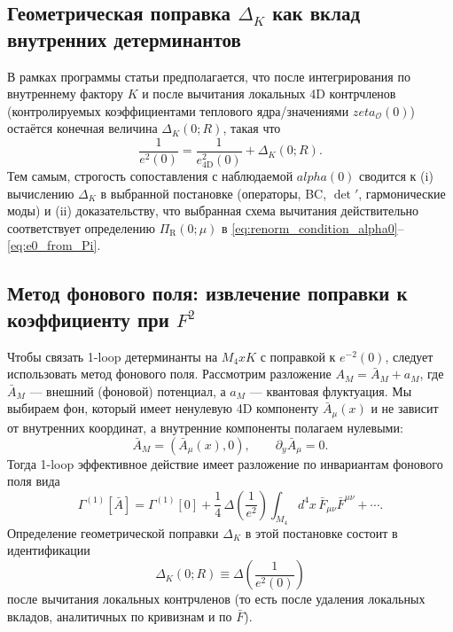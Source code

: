 \documentclass[12pt]{article}
\def\alpha{alpha}%
\def\times{x}%
\def\zeta{zeta}%
\begin{document}
\subsection{Геометрическая поправка \texorpdfstring{$\Delta_K$}{DeltaK} как вклад внутренних детерминантов}
В рамках программы статьи предполагается, что после интегрирования по внутреннему фактору $K$ и после вычитания локальных 4D контрчленов (контролируемых коэффициентами теплового ядра/значениями $\zeta_{\mathcal{O}}(0)$) остаётся конечная величина $\Delta_K(0;R)$, такая что
\begin{equation}
\frac{1}{e^2(0)}
=
\frac{1}{e^2_{\mathrm{4D}}(0)}
+
\Delta_K(0;R).
\end{equation}
Тем самым, строгость сопоставления с наблюдаемой \texorpdfstring{$\alpha(0)$}{alpha(0)} сводится к (i) вычислению $\Delta_K$ в выбранной постановке (операторы, BC, $\det'$, гармонические моды) и (ii) доказательству, что выбранная схема вычитания действительно соответствует определению $\Pi_{\mathrm{R}}(0;\mu)$ в \eqref{eq:renorm_condition_alpha0}--\eqref{eq:e0_from_Pi}.

\subsection{Метод фонового поля: извлечение поправки к коэффициенту при \texorpdfstring{$F^2$}{F2}}
Чтобы связать 1-loop детерминанты на $M_4\times K$ с поправкой к $e^{-2}(0)$, следует использовать метод фонового поля.
Рассмотрим разложение $A_M=\bar A_M+a_M$, где $\bar A_M$ --- внешний (фоновой) потенциал, а $a_M$ --- квантовая флуктуация.
Мы выбираем фон, который имеет ненулевую 4D компоненту $\bar A_\mu(x)$ и не зависит от внутренних координат, а внутренние компоненты полагаем нулевыми:
\begin{equation}
  \bar A_M=(\bar A_\mu(x),0),
  \qquad
  \partial_y \bar A_\mu=0.
\end{equation}
Тогда 1-loop эффективное действие имеет разложение по инвариантам фонового поля вида
\begin{equation}
  \Gamma^{(1)}[\bar A]
  =
  \Gamma^{(1)}[0]
  +
  \frac{1}{4}\,\Delta\!\left(\frac{1}{e^2}\right)
  \int_{M_4} d^4x\, \bar F_{\mu\nu}\bar F^{\mu\nu}
  +\cdots.
\end{equation}
Определение геометрической поправки $\Delta_K$ в этой постановке состоит в идентификации
\begin{equation}
  \Delta_K(0;R)
  \equiv
  \Delta\!\left(\frac{1}{e^2(0)}\right)
\end{equation}
после вычитания локальных контрчленов (то есть после удаления локальных вкладов, аналитичных по кривизнам и по $\bar F$).
\end{document}
